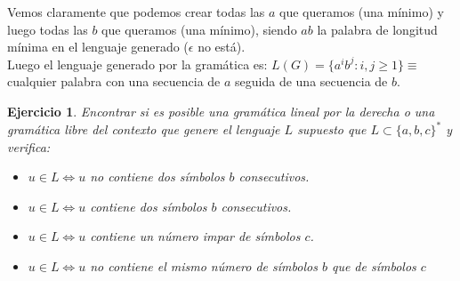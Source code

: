 \documentclass[11pt]{article}
\theoremstyle{ejercicio-style}
\newtheorem{ejer}{Ejercicio}
\begin{document}
Vemos claramente que podemos crear todas las $a$ que queramos (una mínimo) y luego todas las $b$ que queramos (una mínimo), siendo $ab$ la palabra de longitud mínima en el lenguaje generado ($\epsilon$ no está). \\

Luego el lenguaje generado por la gramática es: $L(G) = \{ a^i b^j : i,j \geq 1 \} \equiv$ cualquier palabra con una secuencia de $a$ seguida de una secuencia de $b$. \\

\begin{ejer}
	Encontrar si es posible una gramática lineal por la derecha o una gramática libre del contexto que genere el lenguaje $L$ supuesto que $L \subset {\{a,b,c\}}^{*}$ y verifica:
	\begin{itemize}
		\item $u \in L \iff u$ no contiene dos símbolos $b$ consecutivos.
		\item $u \in L \iff u$ contiene dos símbolos $b$ consecutivos.
		\item $u \in L \iff u$ contiene un número impar de símbolos $c$.
		\item $u \in L \iff u$ no contiene el mismo número de símbolos $b$ que de símbolos $c$
	\end{itemize}
\end{ejer}
\end{document}
